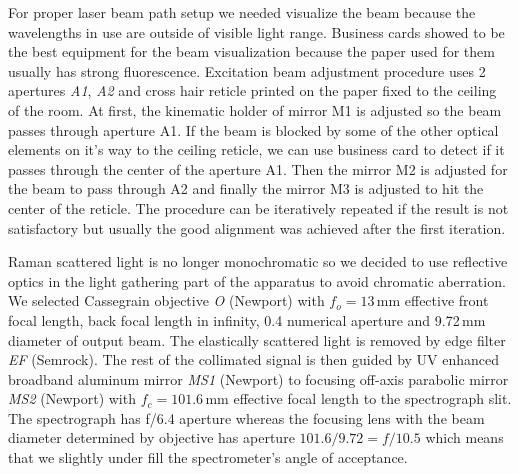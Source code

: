 For proper laser beam path setup we needed visualize the beam because the
wavelengths in use are outside of visible light range. Business cards showed
to be the best equipment for the beam visualization because the paper used for
them usually has strong fluorescence. Excitation beam adjustment procedure
uses 2 apertures \emph{A1}, \emph{A2} and cross hair reticle printed on the
paper fixed to the ceiling of the room. At first, the kinematic holder of
mirror M1 is adjusted so the beam passes through aperture A1. If the beam is
blocked by some of the other optical elements on it's way to the ceiling
reticle, we can use business card to detect if it passes through the center
of the aperture A1. Then the mirror M2 is adjusted for the beam to pass
through A2 and finally the mirror M3 is adjusted to hit the center of the
reticle. The procedure can be iteratively repeated if the result is not
satisfactory but usually the good alignment was achieved after the first
iteration.

Raman scattered light is no longer monochromatic so we decided to use
reflective optics in the light gathering part of the apparatus to avoid
chromatic aberration. We selected Cassegrain objective \emph{O} (Newport) with
$f_o = 13$\,mm effective front focal length, back focal length in infinity,
0.4 numerical aperture and 9.72\,mm diameter of output beam. The elastically
scattered light is removed by edge filter \emph{EF} (Semrock). The rest of the
collimated signal is then guided by UV enhanced broadband aluminum mirror
\emph{MS1} (Newport) to focusing off-axis parabolic mirror \emph{MS2}
(Newport) with $f_c = 101.6$\,mm effective focal length to the spectrograph
slit. The spectrograph has f/6.4 aperture whereas the focusing lens with the
beam diameter determined by objective has aperture $101.6 / 9.72 = f/10.5$
which means that we slightly under fill the spectrometer's angle of acceptance.

